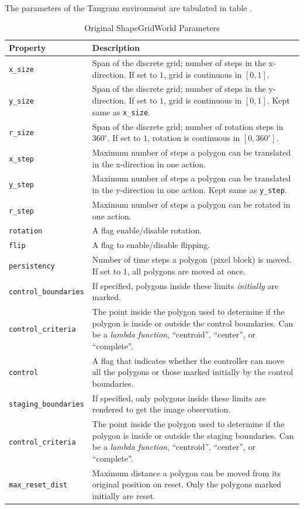 The parameters of the Tangram environment are tabulated in table .
\begin{table}[H]
    \centering
    \begin{tabularx}{\textwidth}{C{4.2cm} L}
        \hline
        Property & Description\\
        \hline
        \texttt{x\_size} & Span of the discrete grid; number of steps in the x-direction. If set to \(1\), grid is continuous in \([0, 1]\).\\
        \texttt{y\_size} & Span of the discrete grid; number of steps in the y-direction. If set to \(1\), grid is continuous in \([0, 1]\). Kept same as \texttt{x\_size}.\\
        \texttt{r\_size} & Span of the discrete grid; number of rotation steps in \(360^\circ\). If set to \(1\), rotation is continuous in \([0, 360^\circ]\).\\
        \texttt{x\_step} & Maximum number of steps a polygon can be translated in the x-direction in one action.\\
        \texttt{y\_step} & Maximum number of steps a polygon can be translated in the y-direction in one action. Kept same as \texttt{y\_step}.\\
        \texttt{r\_step} & Maximum number of steps a polygon can be rotated in one action.\\
        \texttt{rotation} & A flag enable/disable rotation.\\
        \texttt{flip} & A flag to enable/disable flipping.\\
        \texttt{persistency} & Number of time steps a polygon (pixel block) is moved. If set to \(1\), all polygons are moved at once.\\
        \texttt{control\_boundaries} & If specified, polygons inside these limits \emph{initially} are marked.\\
        \texttt{control\_criteria} & The point inside the polygon used to determine if the polygon is inside or outside the control boundaries. Can be a \emph{lambda function}, ``centroid'', ``center'', or ``complete''.\\
        \texttt{control} & A flag that indicates whether the controller can move all the polygons or those marked initially by the control boundaries.\\
        \texttt{staging\_boundaries} & If specified, only polygons inside these limits are rendered to get the image observation.\\
        \texttt{control\_criteria} & The point inside the polygon used to determine if the polygon is inside or outside the staging boundaries. Can be a \emph{lambda function}, ``centroid'', ``center'', or ``complete''.\\
        \texttt{max\_reset\_dist} & Maximum distance a polygon can be moved from its original position on reset. Only the polygons marked initially are reset.\\
        \hline
    \end{tabularx}
    \caption{Original ShapeGridWorld Parameters}
    \label{tab:tangram-params}
\end{table}
